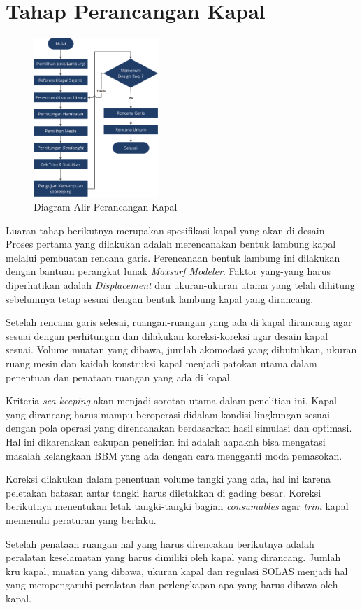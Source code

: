 \section{Tahap Perancangan Kapal}
\label{sec:tahap-deskap}

\begin{figure}[!ht]
    \centering
    \includegraphics[width=0.42\textwidth]{gambar/FC_Deskap.png}
    \caption{Diagram Alir Perancangan Kapal}
    \label{fig:flowchart-deskap}
\end{figure}

Luaran tahap berikutnya merupakan spesifikasi kapal yang akan di desain. Proses pertama yang dilakukan adalah merencanakan bentuk lambung kapal melalui pembuatan rencana garis. Perencanaan bentuk lambung ini dilakukan dengan bantuan perangkat lunak \emph{Maxsurf Modeler}. Faktor yang-yang harus diperhatikan adalah \emph{Displacement} dan ukuran-ukuran utama yang telah dihitung sebelumnya tetap sesuai dengan bentuk lambung kapal yang dirancang.

Setelah rencana garis selesai, ruangan-ruangan yang ada di kapal dirancang agar sesuai dengan perhitungan dan dilakukan koreksi-koreksi agar desain kapal sesuai. Volume muatan yang dibawa, jumlah akomodasi yang dibutuhkan, ukuran ruang mesin dan kaidah konstruksi kapal menjadi patokan utama dalam penentuan dan penataan ruangan yang ada di kapal.

Kriteria \emph{sea keeping} akan menjadi sorotan utama dalam penelitian ini. Kapal yang dirancang harus mampu beroperasi didalam kondisi lingkungan sesuai dengan pola operasi yang direncanakan berdasarkan hasil simulasi dan optimasi. Hal ini dikarenakan cakupan penelitian ini adalah aapakah bisa mengatasi masalah kelangkaan BBM yang ada dengan cara mengganti moda pemasokan.

Koreksi dilakukan dalam penentuan volume tangki yang ada, hal ini karena peletakan batasan antar tangki harus diletakkan di gading besar. Koreksi berikutnya menentukan letak tangki-tangki bagian \emph{consumables} agar \emph{trim} kapal memenuhi peraturan yang berlaku.

Setelah penataan ruangan hal yang harus direncakan berikutnya adalah peralatan keselamatan yang harus dimiliki oleh kapal yang dirancang. Jumlah kru kapal, muatan yang dibawa, ukuran kapal dan regulasi SOLAS menjadi hal yang mempengaruhi peralatan dan perlengkapan apa yang harus dibawa oleh kapal.
